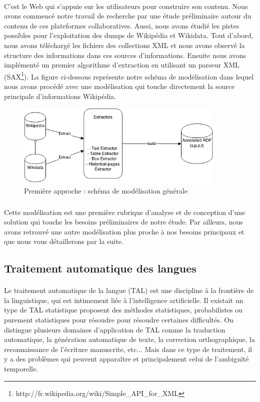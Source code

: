 \documentclass[12pt,a4	]{report}
\begin{document}
\paragraph{}
C'est le Web qui s'appuie sur les utilisateurs pour construire son contenu. Nous avons commencé notre travail de recherche par une étude préliminaire autour du contenu de ces plateformes collaboratives. Aussi, nous avons étudié les pistes possibles pour l'exploitation des dumps de Wikipédia et Wikidata. Tout d'abord, nous avons téléchargé les fichiers des collections XML et nous avons observé la structure des informations dans ces sources d'informations. Ensuite nous avons implémenté un premier algorithme d'extraction en utilisant un parseur XML (SAX\footnote{http://fr.wikipedia.org/wiki/Simple\_API\_for\_XML}).
La figure ci-dessous représente notre schéma de modélisation dans lequel nous avons procédé avec une modélisation qui touche directement la source principale d'informations Wikipédia.
\begin{figure}[H]
        \centering
                \centering
                \includegraphics[width=10cm]{modelisation.png}
               \caption{Première approche : schéma de modélisation générale}

\end{figure}
\subparagraph{}
Cette modélisation est une première rubrique d'analyse et de conception d'une solution qui touche les besoins préliminaires de notre étude. Par ailleurs, nous avons retrouvé une autre modélisation plus proche à nos besoins principaux et que nous vous détaillerons par la suite.
\subsection{Traitement automatique des langues}
\paragraph{}
Le traitement automatique de la langue (TAL) est une discipline à la frontière de la linguistique, qui est intimement liée à l'intelligence artificielle.
Il existait un type de TAL statistique proposent des méthodes statistiques, probabilistes ou purement statistiques pour résoudre pour résoudre certaines difficultés.
On distingue plusieurs domaines d'application de TAL comme la traduction automatique, la génération automatique de texte, la correction orthographique, la reconnaissance de l'écriture manuscrite, etc...
Mais dans ce type de traitement, il y a des problèmes qui peuvent apparaître et principalement celui de l'ambiguïté temporelle.
\end{document}
